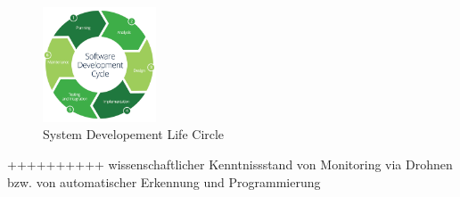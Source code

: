 \begin{figure}[htb]
 \centering
 \includegraphics[width=0.3\textwidth,angle=0]{abb/SDLC}
 \caption{System Developement Life Circle}
\label{fig:sdlc}
\end{figure}




%
%


++++++++++ wissenschaftlicher Kenntnissstand von Monitoring via Drohnen bzw. von automatischer Erkennung und Programmierung 
